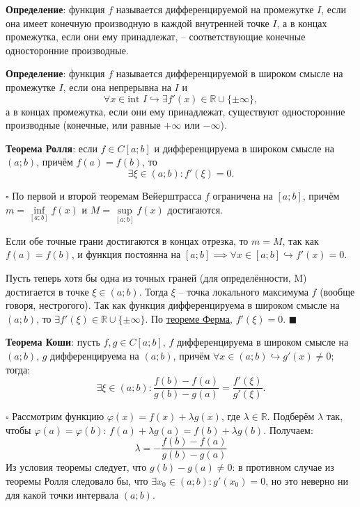 \documentclass[12pt, a4paper, reqno]{article}
\begin{document}
    \textbf{Определение}: функция $f$ называется дифференцируемой на промежутке $I$, если она
    имеет конечную производную в каждой внутренней точке $I$, а в концах промежутка, если они ему
    принадлежат, -- соответствующие конечные односторонние производные.

    \textbf{Определение}: функция $f$ называется дифференцируемой в широком смысле на промежутке
    $I$, если она непрерывна на $I$ и
    \begin{equation*}
        \forall x \in \text{int }I \hookrightarrow \exists f'(x) \in \mathbb{R}\cup\{\pm\infty\},
    \end{equation*}
    а в концах промежутка, если они ему принадлежат, существуют односторонние производные (конечные,
    или равные $+\infty$ или $-\infty$).

    \textbf{Теорема Ролля}: если $f \in C[a; b]$ и дифференцируема в широком смысле на $(a; b)$,
    причём $f(a) = f(b)$, то
    \begin{equation*}
        \exists\xi\in(a; b): f'(\xi) = 0.
    \end{equation*}

    $\square$ По первой и второй теоремам Вейерштрасса $f$ ограничена на $[a; b]$, причём
    $m = \inf\limits_{[a; b]} f(x)$ и $M = \sup\limits_{[a; b]} f(x)$ достигаются.

    Если обе точные грани достигаются в концах отрезка, то $m = M$, так как $f(a) = f(b)$, и функция
    постоянна на $[a; b] \implies \forall x\in[a; b]\hookrightarrow f'(x) = 0$.

    Пусть теперь хотя бы одна из точных граней (для определённости, M) достигается в точке
    $\xi\in(a; b)$. Тогда $\xi$ -- точка локального максимума $f$ (вообще говоря, нестрогого). Так
    как функция дифференцируема в широком смысле на $(a; b)$, то
    $\exists f'(\xi)\in\mathbb{R}\cup\{\pm\infty\}$. По \hyperlink{fermat}{теореме Ферма}, $f'(\xi) = 0$.
    $\blacksquare$

    \textbf{Теорема Коши}: пусть $f, g \in C[a; b]$, $f$ дифференцируема в широком смысле на $(a; b)$,
    $g$ дифференцируема на $(a; b)$, причём $\forall x \in (a; b) \hookrightarrow g'(x) \neq 0$; тогда:
    \begin{equation*}
        \exists \xi \in (a; b): \dfrac{f(b) - f(a)}{g(b) - g(a)} = \dfrac{f'(\xi)}{g'(\xi)}.
    \end{equation*}

    $\square$ Рассмотрим функцию $\varphi(x) = f(x) + \lambda g(x)$, где $\lambda\in\mathbb{R}$.
    Подберём $\lambda$ так, чтобы $\varphi(a) = \varphi(b)$: $f(a) + \lambda g(a) = f(b) + \lambda
    g(b)$. Получаем:
    \begin{equation*}
        \lambda = -\dfrac{f(b) - f(a)}{g(b) - g(a)}
    \end{equation*}
    Из условия теоремы следует, что $g(b) - g(a)\neq 0$: в противном случае из теоремы Ролля следовало
    бы, что $\exists x_0\in(a; b): g'(x_0) = 0$, но это неверно ни для какой точки интервала $(a; b)$.
\end{document}
